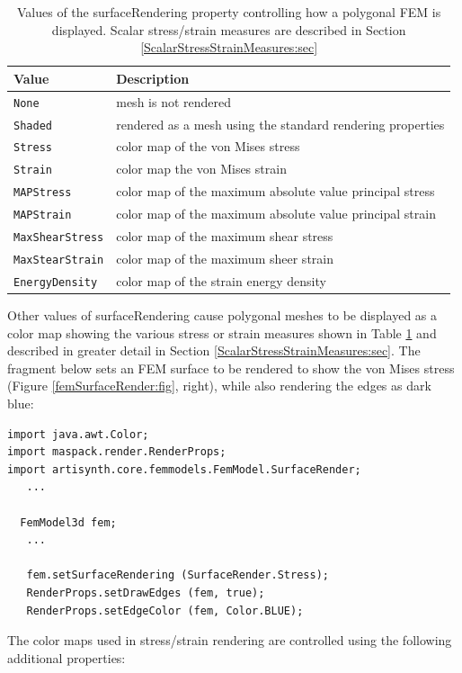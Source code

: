 \begin{table}[ht]
\caption{Values of the {\sf surfaceRendering} property
controlling how a polygonal FEM is displayed. Scalar stress/strain
measures are described in
Section \ref{ScalarStressStrainMeasures:sec}}
\begin{center}
\begin{tabular}{ll}
\hline
Value & Description\\
\hline
{\tt None} & mesh is not rendered\\
{\tt Shaded} & rendered as a mesh using the standard rendering properties\\
{\tt Stress} & color map of the von Mises stress\\
{\tt Strain} & color map the von Mises strain\\
{\tt MAPStress} & color map of the maximum absolute value principal stress\\
{\tt MAPStrain} & color map of the maximum absolute value principal strain\\
{\tt MaxShearStress} & color map of the maximum shear stress\\
{\tt MaxStearStrain} & color map of the maximum sheer strain\\
{\tt EnergyDensity} & color map of the strain energy density\\
\hline
\end{tabular}
\end{center}
\label{surfaceRendering:tab}
\end{table}
%
Other values of {\sf surfaceRendering} cause polygonal meshes to be
displayed as a color map showing the various stress or strain measures
shown in Table \ref{surfaceRendering:tab} and described in greater
detail in Section \ref{ScalarStressStrainMeasures:sec}.  The fragment
below sets an FEM surface to be rendered to show the von Mises stress
(Figure \ref{femSurfaceRender:fig}, right), while also rendering the
edges as dark blue:
%
\begin{lstlisting}[]
import java.awt.Color;
import maspack.render.RenderProps;
import artisynth.core.femmodels.FemModel.SurfaceRender;
   ...

  FemModel3d fem;
   ...

   fem.setSurfaceRendering (SurfaceRender.Stress);
   RenderProps.setDrawEdges (fem, true);
   RenderProps.setEdgeColor (fem, Color.BLUE);
\end{lstlisting}
%
The color maps used in stress/strain rendering are controlled using
the following additional properties:

